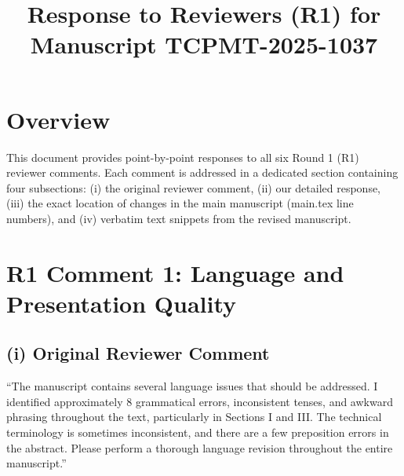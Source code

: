 \documentclass[conference]{IEEEtran}
\begin{document}
\title{Response to Reviewers (R1) for Manuscript TCPMT-2025-1037}

\author{
}

\maketitle

\section*{Overview}
This document provides point-by-point responses to all six Round 1 (R1) reviewer comments. Each comment is addressed in a dedicated section containing four subsections: (i) the original reviewer comment, (ii) our detailed response, (iii) the exact location of changes in the main manuscript (main.tex line numbers), and (iv) verbatim text snippets from the revised manuscript.

\section*{R1 Comment 1: Language and Presentation Quality}

\subsection*{(i) Original Reviewer Comment}
``The manuscript contains several language issues that should be addressed. I identified approximately 8 grammatical errors, inconsistent tenses, and awkward phrasing throughout the text, particularly in Sections I and III. The technical terminology is sometimes inconsistent, and there are a few preposition errors in the abstract. Please perform a thorough language revision throughout the entire manuscript.''
\end{document}
